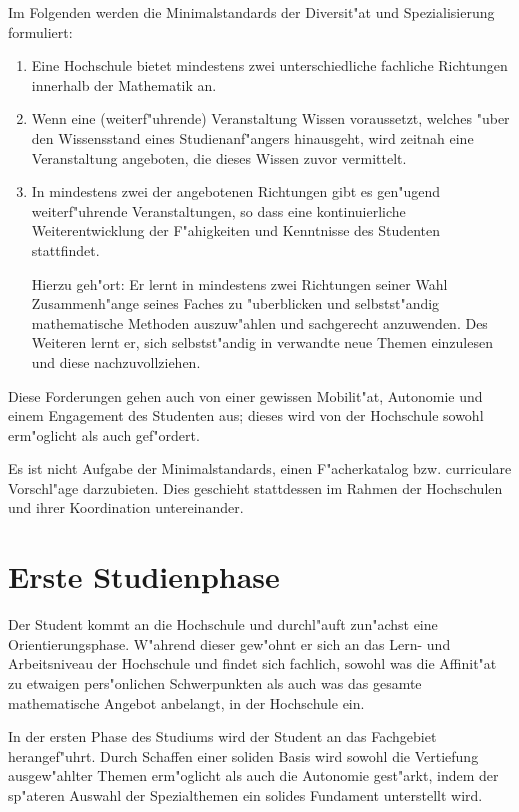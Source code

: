 Im Folgenden werden die Minimalstandards der Diversit"at und Spezialisierung formuliert:
\begin{enumerate}
\item Eine Hochschule bietet mindestens zwei unterschiedliche fachliche Richtungen innerhalb der Mathematik an.

\item Wenn eine (weiterf"uhrende) Veranstaltung Wissen voraussetzt,
welches "uber den Wissensstand eines Studienanf"angers hinausgeht,
wird zeitnah eine Veranstaltung angeboten, die dieses Wissen zuvor vermittelt.

\item In mindestens zwei der angebotenen Richtungen gibt es gen"ugend
weiterf"uhrende Veranstaltungen, so dass eine kontinuierliche
Weiterentwicklung der F"ahigkeiten und Kenntnisse des Studenten
stattfindet.

Hierzu geh"ort: Er lernt in mindestens zwei Richtungen seiner Wahl
Zusammenh"ange seines Faches zu "uberblicken und selbstst"andig
mathematische Methoden auszuw"ahlen und sachgerecht anzuwenden.
Des Weiteren lernt er, sich selbstst"andig in verwandte neue Themen
einzulesen und diese nachzuvollziehen.
\end{enumerate}

Diese Forderungen gehen auch von einer gewissen Mobilit"at, Autonomie
und einem Engagement des Studenten aus; dieses wird von
der Hochschule sowohl erm"oglicht als auch gef"ordert.

Es ist nicht Aufgabe der Minimalstandards, einen F"acherkatalog bzw.
curriculare Vorschl"age darzubieten. Dies geschieht stattdessen im
Rahmen der Hochschulen und ihrer Koordination untereinander.




\section{Erste Studienphase}

Der
Student kommt an die Hochschule und durchl"auft zun"achst eine Orientierungsphase.
W"ahrend dieser gew"ohnt er sich an das Lern- und Arbeitsniveau der Hochschule und
findet sich fachlich, sowohl was die Affinit"at zu etwaigen pers"onlichen Schwerpunkten
als auch was das gesamte mathematische Angebot anbelangt, in der Hochschule ein.

In der ersten Phase des Studiums wird der Student an das Fachgebiet herangef"uhrt.
Durch Schaffen einer soliden Basis wird sowohl die Vertiefung ausgew"ahlter Themen
erm"oglicht als auch die Autonomie gest"arkt, indem der sp"ateren Auswahl der
Spezialthemen ein solides Fundament unterstellt wird.

